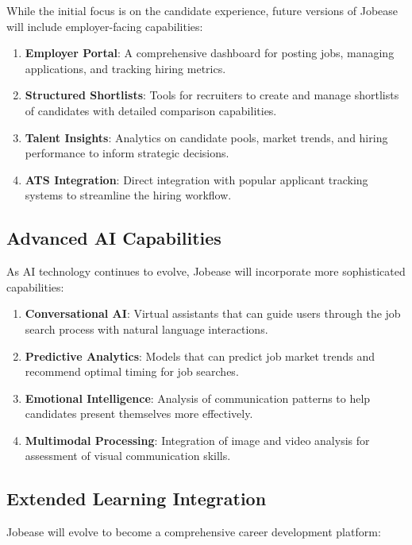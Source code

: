 \documentclass[12pt,a4paper]{report}
\begin{document}
While the initial focus is on the candidate experience, future versions of Jobease will include employer-facing capabilities:

\begin{enumerate}
    \item \textbf{Employer Portal}: A comprehensive dashboard for posting jobs, managing applications, and tracking hiring metrics.
    \item \textbf{Structured Shortlists}: Tools for recruiters to create and manage shortlists of candidates with detailed comparison capabilities.
    \item \textbf{Talent Insights}: Analytics on candidate pools, market trends, and hiring performance to inform strategic decisions.
    \item \textbf{ATS Integration}: Direct integration with popular applicant tracking systems to streamline the hiring workflow.
\end{enumerate}

\subsection*{Advanced AI Capabilities}

As AI technology continues to evolve, Jobease will incorporate more sophisticated capabilities:

\begin{enumerate}
    \item \textbf{Conversational AI}: Virtual assistants that can guide users through the job search process with natural language interactions.
    \item \textbf{Predictive Analytics}: Models that can predict job market trends and recommend optimal timing for job searches.
    \item \textbf{Emotional Intelligence}: Analysis of communication patterns to help candidates present themselves more effectively.
    \item \textbf{Multimodal Processing}: Integration of image and video analysis for assessment of visual communication skills.
\end{enumerate}

\subsection*{Extended Learning Integration}

Jobease will evolve to become a comprehensive career development platform:
\end{document}
